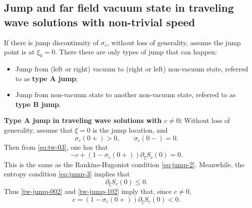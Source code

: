 \documentclass[12pt]{article}
\theoremstyle{definition}
\theoremstyle{remark}
\numberwithin{equation}{section}
\begin{document}
\subsection{Jump and far field vacuum state in traveling wave solutions with non-trivial speed}
\label{subsec:no-jump-tw}
If there is jump discontinuity of $ \sigma_c $, 
without loss of generality, assume the jump point is at $ \xi_0 = 0 $. There there are only types of jump that can happen:
\begin{itemize}
    \item Jump from (left or right) vacuum to (right or left) non-vacuum state, referred to as {\bf type A jump};
    \item Jump from non-vacuum state to another non-vacuum state, referred to as {\bf type B jump}. 
\end{itemize}
{\noindent\bf Type A jump in traveling wave solutions with $ c \neq 0 $:} Without loss of generality, assume that $ \xi = 0 $ is the jump location, and 
\begin{equation}
\label{tw-jump-001}
    \sigma_c(0+) > 0, \qquad \sigma_c(0-) = 0. 
\end{equation}
Then from \eqref{eq:tw-03}, one has that
\begin{equation}
\label{tw-jump-002}
    -c + (1-\sigma_c(0+)) \partial_\xi S_c(0)= 0. 
\end{equation}
This is the same as the Rankine-Hugoniot condition \eqref{eq:jump-2}. Meanwhile, the entropy condition \eqref{eq:jump-3} implies that 
\begin{equation}
    \label{tw-jump-102}
    \partial_\xi S_c(0) \leq 0.
\end{equation}
Thus \eqref{tw-jump-002} and \eqref{tw-jump-102} imply that, since $ c \neq 0 $, 
\begin{equation}
    \label{tw-jump-103}
    c = (1-\sigma_c(0+)) \partial_\xi S_c(0) < 0.
\end{equation}

\smallskip 
\end{document}
